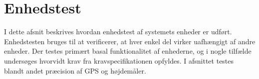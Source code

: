 \chapter{Enhedstest}
I dette afsnit beskrives hvordan enhedstest af systemets enheder er udført. Enhedstesten bruges til at verificerer, at hver enkel del virker uafhængigt af andre enheder. 
Der testes primært basal funktionalitet af enhederne, og i nogle tilfælde undersøges hvorvidt krav fra kravspecifikationen opfyldes. I afsnittet testes blandt andet præcision af GPS og højdemåler.





\newpage


\newpage


\newpage 


\newpage

